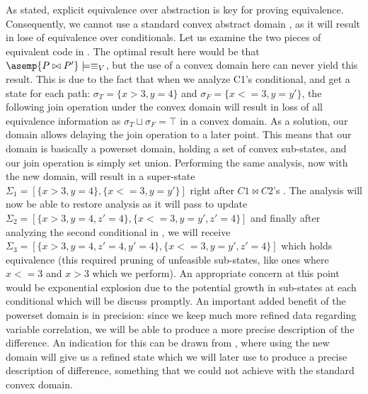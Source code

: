 As stated, explicit equivalence over abstraction is key for proving equivalence. Consequently, we cannot use a standard convex abstract domain \cite{JeannetMine09}, as it will result in lose of equivalence over conditionals. Let us examine the two pieces of equivalent code in . The optimal result here would be that $\asemp{P \bowtie P'} \models \equiv_V$, but the use of a convex domain here can never yield this result. This is due to the fact that when we analyze C1's conditional, and get a state for each path: $\sigma_T = \{x>3,y=4\}$ and $\sigma_F = \{x<=3,y=y'\}$, the following join operation under the convex domain will result in loss of all equivalence information as $\sigma_T \sqcup \sigma_F = \top$ in a convex domain. As a solution, our domain allows delaying the join operation to a later point. This means that our domain is basically a powerset domain, holding a set of convex sub-states, and our join operation is simply set union. Performing the same analysis, now with the new domain, will result in a super-state $\Sigma_1 = [\{x>3,y=4\},\{x<=3,y=y'\}]$ right after $C1 \bowtie C2$'s . The analysis will now be able to restore analysis as it will pass  to update $\Sigma_2 = [\{x>3,y=4,z'=4\},\{x<=3,y=y',z'=4\}]$ and finally after analyzing the second conditional in , we will receive $\Sigma_3 = [\{x>3,y=4,z'=4,y'=4\},\{x<=3,y=y',z'=4\}]$ which holds equivalence (this required pruning of unfeasible sub-states, like ones where $x<=3$ and $x>3$ which we perform).  An appropriate concern at this point would be exponential explosion due to the potential growth in sub-states at each conditional which will be discuss promptly. An important added benefit of the powerset domain is in precision: since we keep much more refined data regarding variable correlation, we will be able to produce a more precise description of the difference. An indication for this can be drawn from , where using the new domain will give us a refined state which we will later use to produce a precise description of difference, something that we could not achieve with the standard convex domain.

